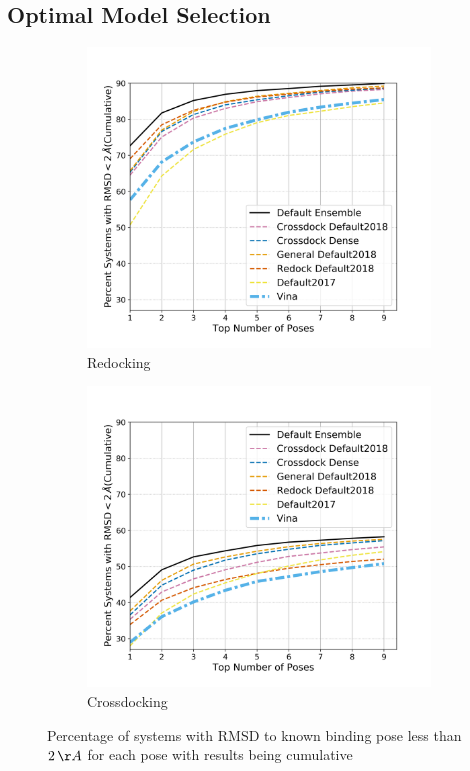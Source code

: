\documentclass[journal=jcisd8,manuscript=article]{achemso}
\begin{document}
\subsection{Optimal Model Selection}
\begin{figure}
	\begin{subfigure}[b]{0.48\textwidth}
		\centering
		\includegraphics[width=\textwidth]{figures/redocking/rescore_single_models_line.png}
		\caption{Redocking}
		\label{fig:RescoreSingleRedock}
        \end{subfigure}    
	\begin{subfigure}[b]{0.48\textwidth}    
		\centering
		\includegraphics[width=\textwidth]{figures/crossdocking/rescore_single_models_line.png}
		\caption{Crossdocking}
		\label{fig:RescoreSingleCrossdock}
        \end{subfigure}    
	\caption{Percentage of systems with RMSD to known binding pose less than $2\,\AA$ for each pose with results being cumulative}
	\label{fig:RescoreSingle}
\end{figure}    
\end{document}
